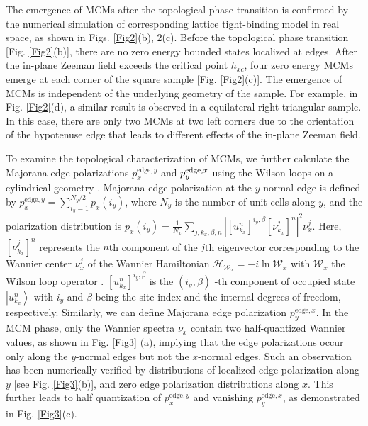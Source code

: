 \documentclass[twocolumn,prl,floatfix,citeautoscript,nofootinbib,superscriptaddress]{revtex4}
\begin{document}
The emergence of MCMs after the topological phase transition is confirmed by
the numerical simulation of corresponding lattice tight-binding model in
real space, as shown in Figs. \ref{Fig2}(b), 2(c). Before the topological
phase transition [Fig. \ref{Fig2}(b)], there are no zero energy bounded
states localized at edges. After the in-plane Zeeman field exceeds the
critical point $h_{xc}$, four zero energy MCMs emerge at each corner of the
square sample [Fig. \ref{Fig2}(c)]. The emergence of MCMs is independent of
the underlying geometry of the sample. For example, in Fig. \ref{Fig2}(d), a
similar result is observed in a equilateral right triangular sample. In this
case, there are only two MCMs at two left corners due to the orientation of
the hypotenuse edge that leads to different effects of the in-plane Zeeman
field.

To examine the topological characterization of MCMs, we further calculate
the Majorana edge polarizations $p_{x}^{\mathrm{edge},y}$ and $p_{y}^{%
\mathrm{edge},x}$ using the Wilson loops on a cylindrical geometry \cite%
{Khalaf19,Benalcazar17}. Majorana edge polarization at the $y$-normal edge
is defined by $p_{x}^{\mathrm{edge},y}=\sum_{i_{y}=1}^{N_{y}/2}p_{x}\left(
i_{y}\right) $, where $N_{y}$ is the number of unit cells along $y$, and the
polarization distribution is $p_{x}\left( i_{y}\right) =\frac{1}{N_{x}}%
\sum_{j,k_{x},\beta ,n}\left\vert \left[ u_{k_{x}}^{n}\right] ^{i_{y},\beta }%
\left[ \nu _{k_{x}}^{j}\right] ^{n}\right\vert ^{2}\nu _{x}^{j}$. Here, $%
\left[ \nu _{k_{x}}^{j}\right] ^{n}$ represents the $n$th component of the $%
j $th eigenvector corresponding to the Wannier center $\nu _{x}^{j}$ of the
Wannier Hamiltonian $\mathcal{H}_{\mathcal{W}_{x}}=-i\ln \mathcal{W}_{x}$
with $\mathcal{W}_{x}$ the Wilson loop operator \cite{SM}. $\left[
u_{k_{x}}^{n}\right] ^{i_{y},\beta }$ is the $\left( i_{y},\beta \right) $%
-th component of occupied state $\left\vert u_{k_{x}}^{n}\right\rangle $
with $i_{y}$ and $\beta $ being the site index and the internal degrees of
freedom, respectively. Similarly, we can define Majorana edge polarization $%
p_{y}^{\mathrm{edge},x}$. In the MCM phase, only the Wannier spectra $\nu
_{x}$ contain two half-quantized Wannier values, as shown in Fig. \ref{Fig3}%
(a), implying that the edge polarizations occur only along the $y$-normal
edges but not the $x$-normal edges. Such an observation has been numerically
verified by distributions of localized edge polarization along $y$ [see Fig. %
\ref{Fig3}(b)], and zero edge polarization distributions along $x$. This
further leads to half quantization of $p_{x}^{\mathrm{edge},y}$ and
vanishing $p_{y}^{\mathrm{edge},x}$, as demonstrated in Fig. \ref{Fig3}(c).
\end{document}
